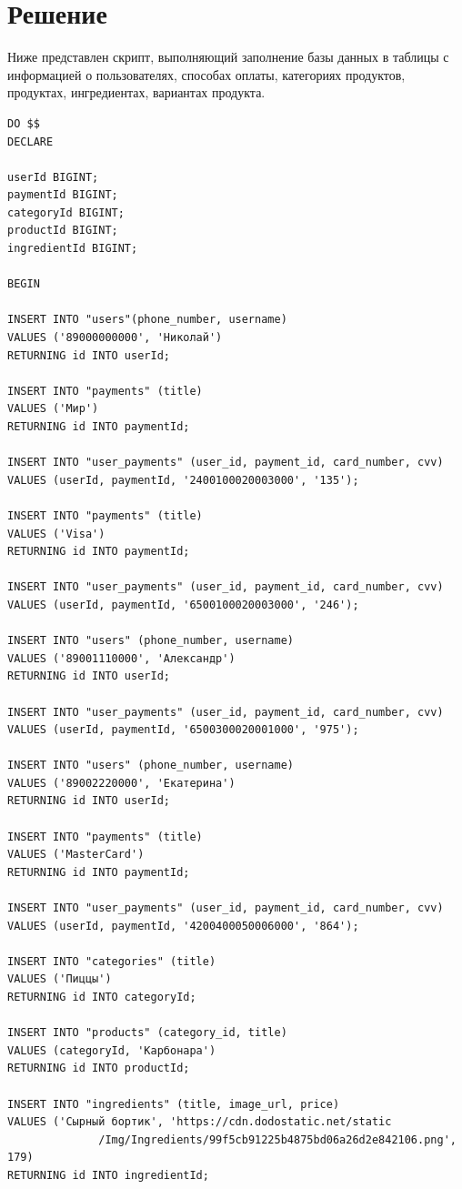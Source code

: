 \documentclass[a4paper,14pt]{extarticle}
\begin{document}
  \pagebreak
  \section*{Решение}
  Ниже представлен скрипт, выполняющий заполнение базы данных в таблицы с информацией о пользователях, способах оплаты, категориях продуктов, продуктах, ингредиентах, вариантах продукта.

  \noindent
  \begin{Verbatim}[tabsize=4,fontsize=\small]
DO $$
DECLARE

userId BIGINT;
paymentId BIGINT;
categoryId BIGINT;
productId BIGINT;
ingredientId BIGINT;

BEGIN

INSERT INTO "users"(phone_number, username)
VALUES ('89000000000', 'Николай')
RETURNING id INTO userId;

INSERT INTO "payments" (title)
VALUES ('Мир')
RETURNING id INTO paymentId;

INSERT INTO "user_payments" (user_id, payment_id, card_number, cvv)
VALUES (userId, paymentId, '2400100020003000', '135');

INSERT INTO "payments" (title)
VALUES ('Visa')
RETURNING id INTO paymentId;

INSERT INTO "user_payments" (user_id, payment_id, card_number, cvv)
VALUES (userId, paymentId, '6500100020003000', '246');

INSERT INTO "users" (phone_number, username)
VALUES ('89001110000', 'Александр')
RETURNING id INTO userId;

INSERT INTO "user_payments" (user_id, payment_id, card_number, cvv)
VALUES (userId, paymentId, '6500300020001000', '975');

INSERT INTO "users" (phone_number, username)
VALUES ('89002220000', 'Екатерина')
RETURNING id INTO userId;

INSERT INTO "payments" (title)
VALUES ('MasterCard')
RETURNING id INTO paymentId;

INSERT INTO "user_payments" (user_id, payment_id, card_number, cvv)
VALUES (userId, paymentId, '4200400050006000', '864');

INSERT INTO "categories" (title)
VALUES ('Пиццы')
RETURNING id INTO categoryId;

INSERT INTO "products" (category_id, title)
VALUES (categoryId, 'Карбонара')
RETURNING id INTO productId;

INSERT INTO "ingredients" (title, image_url, price)
VALUES ('Сырный бортик', 'https://cdn.dodostatic.net/static
              /Img/Ingredients/99f5cb91225b4875bd06a26d2e842106.png', 179)
RETURNING id INTO ingredientId;


\end{Verbatim}
\end{document}
